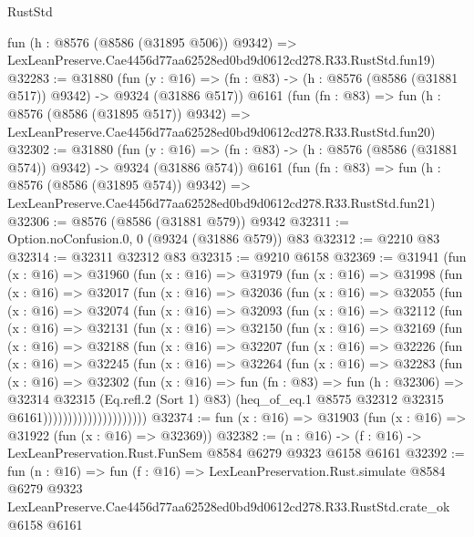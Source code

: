 \begin{lexlean}{RustStd}
\begin{coremodule}
    fun (h : @8576 (@8586 (@31895 @506)) @9342) =>
    LexLeanPreserve.Cae4456d77aa62528ed0bd9d0612cd278.R33.RustStd.fun19)
@32283 := @31880
    (fun (y : @16) => (fn : @83) -> (h : @8576 (@8586 (@31881 @517)) @9342) -> @9324 (@31886 @517))
    @6161
    (fun (fn : @83) =>
    fun (h : @8576 (@8586 (@31895 @517)) @9342) =>
    LexLeanPreserve.Cae4456d77aa62528ed0bd9d0612cd278.R33.RustStd.fun20)
@32302 := @31880
    (fun (y : @16) => (fn : @83) -> (h : @8576 (@8586 (@31881 @574)) @9342) -> @9324 (@31886 @574))
    @6161
    (fun (fn : @83) =>
    fun (h : @8576 (@8586 (@31895 @574)) @9342) =>
    LexLeanPreserve.Cae4456d77aa62528ed0bd9d0612cd278.R33.RustStd.fun21)
@32306 := @8576 (@8586 (@31881 @579)) @9342
@32311 := Option.noConfusion.{0, 0} (@9324 (@31886 @579)) @83
@32312 := @2210 @83
@32314 := @32311 @32312 @83
@32315 := @9210 @6158
@32369 := @31941
    (fun (x : @16) =>
    @31960
      (fun (x : @16) =>
      @31979
        (fun (x : @16) =>
        @31998
          (fun (x : @16) =>
          @32017
            (fun (x : @16) =>
            @32036
              (fun (x : @16) =>
              @32055
                (fun (x : @16) =>
                @32074
                  (fun (x : @16) =>
                  @32093
                    (fun (x : @16) =>
                    @32112
                      (fun (x : @16) =>
                      @32131
                        (fun (x : @16) =>
                        @32150
                          (fun (x : @16) =>
                          @32169
                            (fun (x : @16) =>
                            @32188
                              (fun (x : @16) =>
                              @32207
                                (fun (x : @16) =>
                                @32226
                                  (fun (x : @16) =>
                                  @32245
                                    (fun (x : @16) =>
                                    @32264
                                      (fun (x : @16) =>
                                      @32283
                                        (fun (x : @16) =>
                                        @32302
                                          (fun (x : @16) =>
                                          fun (fn : @83) =>
                                          fun (h : @32306) =>
                                          @32314
                                            @32315
                                            (Eq.refl.{2} (Sort 1) @83)
                                            (heq_of_eq.{1}
                                              @8575
                                              @32312
                                              @32315
                                              @6161)))))))))))))))))))))
@32374 := fun (x : @16) => @31903 (fun (x : @16) => @31922 (fun (x : @16) => @32369))
@32382 := (n : @16) -> (f : @16) -> LexLeanPreservation.Rust.FunSem @8584 @6279 @9323 @6158 @6161
@32392 := fun (n : @16) =>
  fun (f : @16) =>
  LexLeanPreservation.Rust.simulate
    @8584
    @6279
    @9323
    LexLeanPreserve.Cae4456d77aa62528ed0bd9d0612cd278.R33.RustStd.crate_ok
    @6158
    @6161
\end{coremodule}
\end{lexlean}
